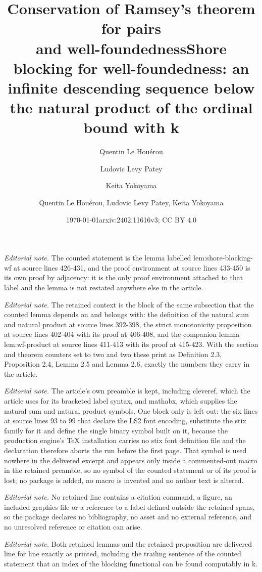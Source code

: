 \documentclass{article}
\author{Quentin Le Hou\'erou \and Ludovic Levy Patey \and Keita Yokoyama}
\title{Conservation of Ramsey's theorem for pairs\\ and well-foundedness}
\date{\today}
\title{Shore blocking for well-foundedness: an infinite descending sequence below the natural product of the ordinal bound with k}
\author{Quentin Le Houérou, Ludovic Levy Patey, Keita Yokoyama}
\date{arxiv:2402.11616v3; CC BY 4.0}
\numberwithin{theorem}{section}
\begin{document}
\maketitle
\setcounter{section}{2}
\setcounter{theorem}{2}
\noindent\textit{Editorial note.} The counted statement is the lemma labelled lem:shore-blocking-wf at source lines 426-431, and the proof environment at source lines 433-450 is its own proof by adjacency: it is the only proof environment attached to that label and the lemma is not restated anywhere else in the article.\par\medskip
\noindent\textit{Editorial note.} The retained context is the block of the same subsection that the counted lemma depends on and belongs with: the definition of the natural sum and natural product at source lines 392-398, the strict monotonicity proposition at source lines 402-404 with its proof at 406-408, and the companion lemma lem:wf-product at source lines 411-413 with its proof at 415-423. With the section and theorem counters set to two and two these print as Definition 2.3, Proposition 2.4, Lemma 2.5 and Lemma 2.6, exactly the numbers they carry in the article.\par\medskip
\noindent\textit{Editorial note.} The article's own preamble is kept, including cleveref, which the article uses for its bracketed label syntax, and mathabx, which supplies the natural sum and natural product symbols. One block only is left out: the six lines at source lines 93 to 99 that declare the LS2 font encoding, substitute the stix family for it and define the single binary symbol built on it, because the production engine's TeX installation carries no stix font definition file and the declaration therefore aborts the run before the first page. That symbol is used nowhere in the delivered excerpt and appears only inside a commented-out macro in the retained preamble, so no symbol of the counted statement or of its proof is lost; no package is added, no macro is invented and no author text is altered.\par\medskip
\noindent\textit{Editorial note.} No retained line contains a citation command, a figure, an included graphics file or a reference to a label defined outside the retained spans, so the package declares no bibliography, no asset and no external reference, and no unresolved reference or citation can arise.\par\medskip
\noindent\textit{Editorial note.} Both retained lemmas and the retained proposition are delivered line for line exactly as printed, including the trailing sentence of the counted statement that an index of the blocking functional can be found computably in k.\par\medskip
\end{document}
